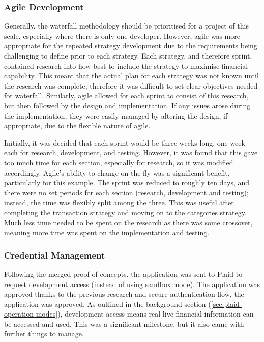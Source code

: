 \subsubsection{Agile Development}
Generally, the waterfall methodology should be prioritised for a project of this scale, especially where there is only one developer. However, agile was more appropriate for the repeated strategy development due to the requirements being challenging to define prior to each strategy. Each strategy, and therefore sprint, contained research into how best to include the strategy to maximise financial capability. This meant that the actual plan for each strategy was not known until the research was complete, therefore it was difficult to set clear objectives needed for waterfall. Similarly, agile allowed for each sprint to consist of this research, but then followed by the design and implementation. If any issues arose during the implementation, they were easily managed by altering the design, if appropriate, due to the flexible nature of agile.

Initially, it was decided that each sprint would be three weeks long, one week each for research, development, and testing. However, it was found that this gave too much time for each section, especially for research, so it was modified accordingly. Agile's ability to change on the fly was a significant benefit, particularly for this example. The sprint was reduced to roughly ten days, and there were no set periods for each section (research, development and testing); instead, the time was flexibly split among the three. This was useful after completing the transaction strategy and moving on to the categories strategy. Much less time needed to be spent on the research as there was some crossover, meaning more time was spent on the implementation and testing.

\subsubsection{Credential Management}
Following the merged proof of concepts, the application was sent to Plaid to request development access (instead of using sandbox mode). The application was approved thanks to the previous research and secure authentication flow, the application was approved. As outlined in the background section (\ref{sec:plaid-operation-modes}), development access means real live financial information can be accessed and used. This was a significant milestone, but it also came with further things to manage.

